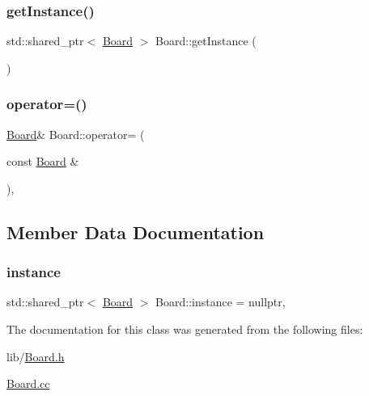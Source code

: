 \subsubsection{\texorpdfstring{get\+Instance()}{getInstance()}}
{\footnotesize\ttfamily std\+::shared\+\_\+ptr$<$ \hyperlink{class_board}{Board} $>$ Board\+::get\+Instance (\begin{DoxyParamCaption}{ }\end{DoxyParamCaption})\hspace{0.3cm}{\ttfamily [static]}}

\mbox{\label{class_board_a892306c4b944bfe904b297092763084a}} 
\subsubsection{\texorpdfstring{operator=()}{operator=()}}
{\footnotesize\ttfamily \hyperlink{class_board}{Board}\& Board\+::operator= (\begin{DoxyParamCaption}\item[{const \hyperlink{class_board}{Board} \&}]{ }\end{DoxyParamCaption})\hspace{0.3cm}{\ttfamily [private]}, {\ttfamily [delete]}}



\subsection{Member Data Documentation}
\mbox{\label{class_board_a5014ff09a45a8e954b8245357b1544ea}} 
\subsubsection{\texorpdfstring{instance}{instance}}
{\footnotesize\ttfamily std\+::shared\+\_\+ptr$<$ \hyperlink{class_board}{Board} $>$ Board\+::instance = nullptr\hspace{0.3cm}{\ttfamily [static]}, {\ttfamily [private]}}



The documentation for this class was generated from the following files\+:\begin{DoxyCompactItemize}
\item 
lib/\hyperlink{_board_8h}{Board.\+h}\item 
\hyperlink{_board_8cc}{Board.\+cc}\end{DoxyCompactItemize}

